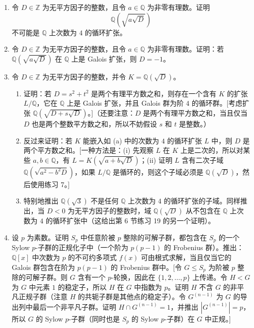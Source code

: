 \begin{enumerate}[label=\arabic*.]
\item 令 $D\in\mathbb Z$ 为无平方因子的整数，且令 $a\in\mathbb Q$ 为非零有理数。证明
\[
\mathbb Q(\sqrt{a\sqrt D})
\]
不可能是 $\mathbb Q$ 上次数为 $4$ 的循环扩张。

\item 令 $D\in\mathbb Z$ 为无平方因子的整数，且令 $a\in\mathbb Q$ 为非零有理数。证明：若 $\mathbb Q(\sqrt{a\sqrt D})$ 在 $\mathbb Q$ 上是 Galois 扩张，则 $D=-1$。

\item 令 $D\in\mathbb Z$ 为无平方因子的整数，并令 $K=\mathbb Q(\sqrt D)$。
\begin{enumerate}[label=(\alph*)]
\item 证明：若 $D=s^2+t^2$ 是两个有理平方数之和，则存在一个含有 $K$ 的扩张 $L/\mathbb Q$，它在 $\mathbb Q$ 上是 Galois 扩张，并且 Galois 群为阶 $4$ 的循环群。[考虑扩张 $\mathbb Q(\sqrt{D+s\sqrt D})$。]（还要注意：$D$ 是两个有理平方数之和，当且仅当 $D$ 也是两个整数平方数之和，所以不妨假设 $s$ 和 $t$ 是整数。）
\item 反过来证明：若 $K$ 能嵌入如 (a) 中的次数为 $4$ 的循环扩张 $L$ 中，则 $D$ 是两个平方数之和。[一种方法是：(i) 先观察 $L$ 在 $K$ 上是二次的，所以对某些 $a,b\in\mathbb Q$，有 $L=K(\sqrt{a+b\sqrt D})$；(ii) 证明 $L$ 含有二次子域 $\mathbb Q(\sqrt{a^2-b^2D})$，如果 $L/\mathbb Q$ 是循环的，则这个子域必须是 $\mathbb Q(\sqrt D)$，然后使用练习 7。]
\item 特别地推出 $\mathbb Q(\sqrt3)$ 不是任何 $\mathbb Q$ 上次数为 $4$ 的循环扩张的子域。同样推出，当 $D<0$ 为无平方因子的整数时，域 $\mathbb Q(\sqrt D)$ 从不包含在 $\mathbb Q$ 上次数为 $4$ 的循环扩张中（这给出第 6 节练习 19 的另一个证明）。
\end{enumerate}

\item 设 $p$ 为素数。证明 $S_p$ 中任意阶被 $p$ 整除的可解子群，都包含在 $S_p$ 的一个 Sylow $p$-子群的正规化子中（一个阶为 $p(p-1)$ 的 Frobenius 群）。推出：$\mathbb Q[x]$ 中次数为 $p$ 的不可约多项式 $f(x)$ 可由根式求解，当且仅当它的 Galois 群包含在阶为 $p(p-1)$ 的 Frobenius 群中。[令 $G\leq S_p$ 为阶被 $p$ 整除的可解子群。则 $G$ 含有一个 $p$-轮换，因此在 $\{1,2,\ldots,p\}$ 上传递。令 $H<G$ 为 $G$ 中元素 $1$ 的稳定子，所以 $H$ 在 $G$ 中指数为 $p$。证明 $H$ 不含 $G$ 的非平凡正规子群（注意 $H$ 的共轭子群是其他点的稳定子）。令 $G^{(n-1)}$ 为 $G$ 的导出列中最后一个非平凡子群。证明 $H\cap G^{(n-1)}=1$，并推出 $|G^{(n-1)}|=p$，所以 $G$ 的 Sylow $p$-子群（同时也是 $S_p$ 的 Sylow $p$-子群）在 $G$ 中正规。]


\end{enumerate}
